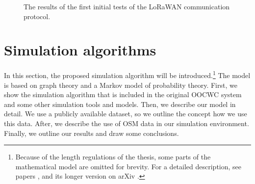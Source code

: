 \documentclass[b5paper,12pt]{report}
\theoremstyle{definition}
\begin{document}
\begin{figure}[!ht]
\begin{minipage}{.4\linewidth}
\end{minipage}
\centering
\caption{The results of the first initial tests of the LoRaWAN communication protocol.}\label{lorawan-test} 
\end{figure}

\chapter{Simulation algorithms}
\label{simul}

In this section, the proposed simulation algorithm will be introduced.\footnote{Because of the length regulations of the thesis, some parts of the mathematical model are omitted for brevity. For a detailed description, see papers \cite{traffic-paper}, \cite{markov-traffic-paper} and its longer version on arXiv \cite{besenczi2020largescale}.} The model is based on graph theory and a Markov model of probability theory. First, we show the simulation algorithm that is included in the original OOCWC system and some other simulation tools and models. Then, we describe our model in detail. We use a publicly available dataset, so we outline the concept how we use this data. After, we describe the use of OSM data in our simulation environment. Finally, we outline our results and draw some conclusions.
\end{document}

